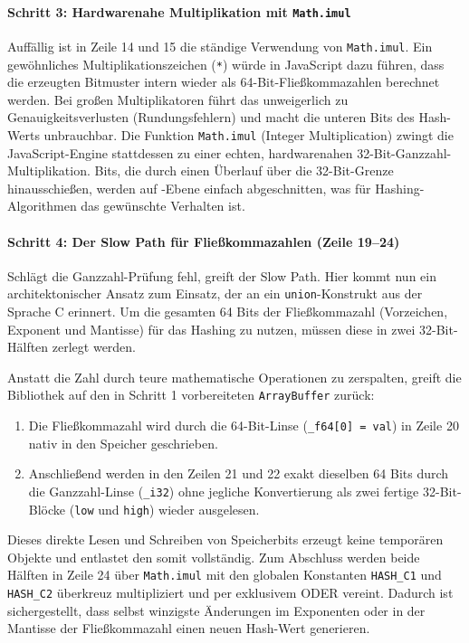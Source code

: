 \paragraph*{Schritt 3: Hardwarenahe Multiplikation mit \texttt{Math.imul}}
Auffällig ist in Zeile 14 und 15 die ständige Verwendung von \texttt{Math.imul}. Ein gewöhnliches Multiplikationszeichen (\texttt{*}) würde in JavaScript dazu führen, dass die erzeugten Bitmuster intern wieder als 64-Bit-Fließkommazahlen berechnet werden. Bei großen Multiplikatoren führt das unweigerlich zu Genauigkeitsverlusten (Rundungsfehlern) und macht die unteren Bits des Hash-Werts unbrauchbar. Die Funktion \texttt{Math.imul} (Integer Multiplication) zwingt die JavaScript-Engine stattdessen zu einer echten, hardwarenahen 32-Bit-Ganzzahl-Multiplikation. Bits, die durch einen Überlauf über die 32-Bit-Grenze hinausschießen, werden auf -Ebene einfach abgeschnitten, was für Hashing-Algorithmen das gewünschte Verhalten ist.

\paragraph*{Schritt 4: Der Slow Path für Fließkommazahlen (Zeile 19–24)}
Schlägt die Ganzzahl-Prüfung fehl, greift der Slow Path. Hier kommt nun ein architektonischer Ansatz zum Einsatz, der an ein \texttt{union}-Konstrukt aus der Sprache C erinnert. Um die gesamten 64 Bits der Fließkommazahl (Vorzeichen, Exponent und Mantisse) für das Hashing zu nutzen, müssen diese in zwei 32-Bit-Hälften zerlegt werden. 

Anstatt die Zahl durch teure mathematische Operationen zu zerspalten, greift die Bibliothek auf den in Schritt 1 vorbereiteten \texttt{ArrayBuffer} zurück:
\begin{enumerate}
    \item Die Fließkommazahl wird durch die 64-Bit-Linse (\texttt{_f64[0] = val}) in Zeile 20 nativ in den Speicher geschrieben.
    \item Anschließend werden in den Zeilen 21 und 22 exakt dieselben 64 Bits durch die Ganzzahl-Linse (\texttt{_i32}) ohne jegliche Konvertierung als zwei fertige 32-Bit-Blöcke (\texttt{low} und \texttt{high}) wieder ausgelesen.
\end{enumerate}
Dieses direkte Lesen und Schreiben von Speicherbits erzeugt keine temporären Objekte und entlastet den  somit vollständig. Zum Abschluss werden beide Hälften in Zeile 24 über \texttt{Math.imul} mit den globalen Konstanten \texttt{HASH_C1} und \texttt{HASH_C2} überkreuz multipliziert und per exklusivem ODER vereint. Dadurch ist sichergestellt, dass selbst winzigste Änderungen im Exponenten oder in der Mantisse der Fließkommazahl einen neuen Hash-Wert generieren.

